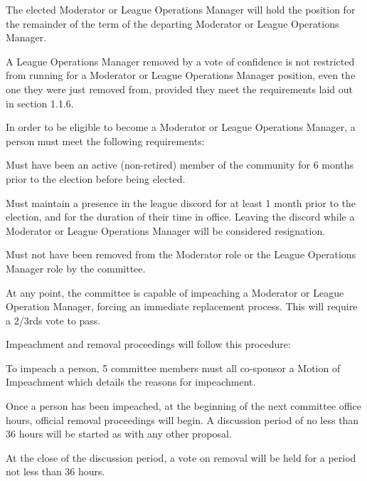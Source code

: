 \begin{deepEnumerate}
\begin{deepEnumerate}
\begin{deepEnumerate}
		\end{deepEnumerate}
		\item The elected Moderator or League Operations Manager will hold the position for the remainder of the term of the departing Moderator or League Operations Manager.
		\item A League Operations Manager removed by a vote of confidence is not restricted from running for a Moderator or League Operations Manager position,
		even the one they were just removed from, provided they meet the requirements laid out in section 1.1.6.
	\end{deepEnumerate}
	\item In order to be eligible to become a Moderator or League Operations Manager, a person must meet the following requirements:
	\begin{deepEnumerate}
		\item Must have been an active (non-retired) member of the community for 6 months prior to the election before being elected.
		\item Must maintain a presence in the league discord for at least 1 month prior to the election, and for the duration of their time in office. 
		Leaving the discord while a Moderator or League Operations Manager will be considered resignation.
		\item Must not have been removed from the Moderator role or the League Operations Manager role by the committee.	
	\end{deepEnumerate}
	\item At any point, the committee is capable of impeaching a Moderator or League Operation Manager, forcing an immediate replacement process.
	This will require a 2/3rds vote to pass.
	\begin{deepEnumerate}
		\item Impeachment and removal proceedings will follow this procedure:
		\begin{deepEnumerate}
			\item To impeach a person, 5 committee members must all co-sponsor a Motion of Impeachment which details the reasons for impeachment.
			\item Once a person has been impeached, at the beginning of the next committee office hours, official removal proceedings will begin. 
			A discussion period of no less than 36 hours will be started as with any other proposal.
			\item At the close of the discussion period, a vote on removal will be held for a period not less than 36 hours. 

\end{deepEnumerate}
\end{deepEnumerate}
\end{deepEnumerate}
